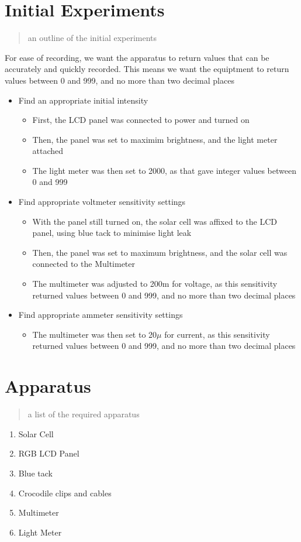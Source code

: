 \documentclass{article}
\begin{document}
\section{Initial Experiments}
\begin{quote}
an outline of the initial experiments
\end{quote}
For ease of recording, we want the apparatus to return values that can be accurately and quickly recorded. This means we want the equiptment to return values between 0 and 999, and no more than two decimal places
\begin{itemize}
  \item Find an appropriate initial intensity
  \begin{itemize}
    \item First, the LCD panel was connected to power and turned on
    \item Then, the panel was set to maximim brightness, and the light meter attached
    \item The light meter was then set to 2000, as that gave integer values between 0 and 999
  \end{itemize}
  \item Find appropriate voltmeter sensitivity settings
  \begin{itemize}
    \item With the panel still turned on, the solar cell was affixed to the LCD panel, using blue tack to minimise light leak
    \item Then, the panel was set to maximum brightness, and the solar cell was connected to the Multimeter
    \item The multimeter was adjusted to 200m for voltage, as this sensitivity returned values between 0 and 999, and no more than two decimal places
  \end{itemize}
  \item Find appropriate ammeter sensitivity settings
  \begin{itemize}
    \item The multimeter was then set to 20$\mu$ for current, as this sensitivity returned values between 0 and 999, and no more than two decimal places
  \end{itemize}
\end{itemize}
\section{Apparatus}
\begin{quote}
a list of the required apparatus
\end{quote}
\begin{enumerate}
  \item Solar Cell
  \item RGB LCD Panel
  \item Blue tack
  \item Crocodile clips and cables
  \item Multimeter
  \item Light Meter
\end{enumerate}
\end{document}
